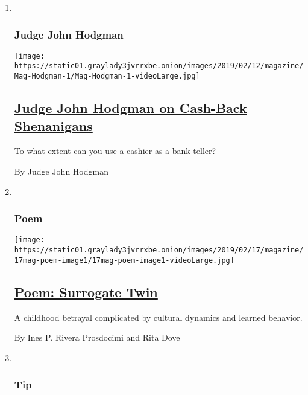 \begin{enumerate}
\def\labelenumi{\arabic{enumi}.}
\item ~
  \hypertarget{judge-john-hodgman}{%
  \subsubsection{Judge John Hodgman}\label{judge-john-hodgman}}

  \texttt{[image: https://static01.graylady3jvrrxbe.onion/images/2019/02/12/magazine/Mag-Hodgman-1/Mag-Hodgman-1-videoLarge.jpg]}

  \hypertarget{judge-john-hodgman-on-cash-back-shenanigans}{%
  \subsection{\texorpdfstring{\href{/2019/02/14/magazine/judge-john-hodgman-on-cash-back-shenanigans.html}{Judge
  John Hodgman on Cash-Back
  Shenanigans}}{Judge John Hodgman on Cash-Back Shenanigans}}\label{judge-john-hodgman-on-cash-back-shenanigans}}

  To what extent can you use a cashier as a bank teller?

  By Judge John Hodgman
\item ~
  \hypertarget{poem}{%
  \subsubsection{Poem}\label{poem}}

  \texttt{[image: https://static01.graylady3jvrrxbe.onion/images/2019/02/17/magazine/17mag-poem-image1/17mag-poem-image1-videoLarge.jpg]}

  \hypertarget{poem-surrogate-twin}{%
  \subsection{\texorpdfstring{\href{/2019/02/14/magazine/poem-surrogate-twin.html}{Poem:
  Surrogate Twin}}{Poem: Surrogate Twin}}\label{poem-surrogate-twin}}

  A childhood betrayal complicated by cultural dynamics and learned
  behavior.

  By Ines P. Rivera Prosdocimi and Rita Dove
\item ~
  \hypertarget{tip}{%
  \subsubsection{Tip}\label{tip}}


\end{enumerate}
